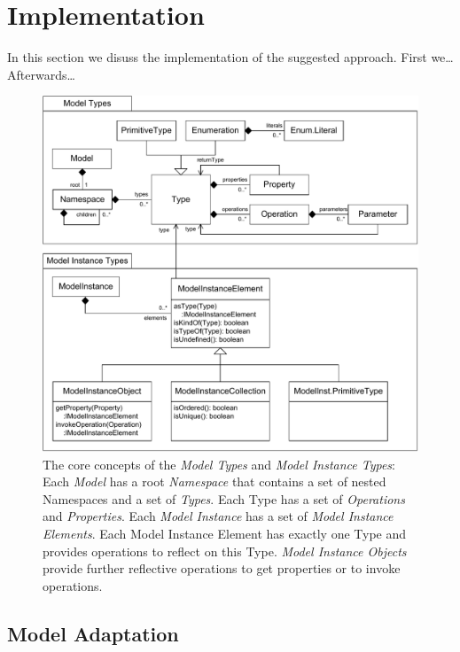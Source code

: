 \section{Implementation}

	In this section we disuss the implementation of the suggested approach.
	First we\ldots Afterwards\ldots
	
	\begin{figure}[!t]
			\centering
				\includegraphics[width=1.00\textwidth]{figures/coreconcepts.pdf}
			\caption{The core concepts of the \textit{Model Types} and \textit{Model Instance Types}:
			Each \textit{Model} has a root \textit{Namespace} that contains a set of nested Namespaces and 
			a set of \textit{Types}. Each Type has a set of \textit{Operations} 
			and \textit{Properties}. 
			Each \textit{Model Instance} has a set of \textit{Model Instance Elements}. Each Model Instance
			Element has exactly one Type and provides 
			operations to reflect on this Type. \textit{Model Instance Objects} provide further reflective 
			operations to get properties or to invoke operations.}
			\label{fig:coreconcepts}
		\end{figure}

\subsection{Model Adaptation}

